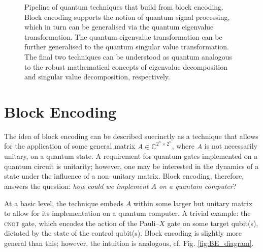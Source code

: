 \documentclass{article}
\begin{document}
\begin{figure}[h!]
    \caption{Pipeline of quantum techniques that build from block encoding. Block encoding supports the notion of quantum signal processing, which in turn can be generalised via the quantum eigenvalue transformation. The quantum eigenvalue transformation can be further generalised to the quantum singular value transformation. The final two techniques can be understood as quantum analogous to the robust mathematical concepts of eigenvalue decomposition and singular value decomposition, respectively.}
    \label{fig:pipeline}
\end{figure}

\clearpage
\section{Block Encoding}
The idea of block encoding can be described succinctly as a technique that allows for the application of some general matrix $A\in\mathbb{C}^{2^n\times 2^n}$, where $A$ is not necessarily unitary, on a quantum state. A requirement for quantum gates implemented on a quantum circuit is unitarity; however, one may be interested in the dynamics of a state under the influence of a non--unitary matrix. Block encoding, therefore, answers the question: \emph{how could we implement $A$ on a quantum computer}?

At a basic level, the technique embeds $A$ within some larger but unitary matrix to allow for its implementation on a quantum computer. A trivial example: the \textsc{cnot} gate, which encodes the action of the Pauli--$X$ gate on some target qubit(s), dictated by the state of the control qubit(s). Block encoding is slightly more general than this; however, the intuition is analogous, cf. Fig. \ref{fig:BE_diagram}.
\end{document}
